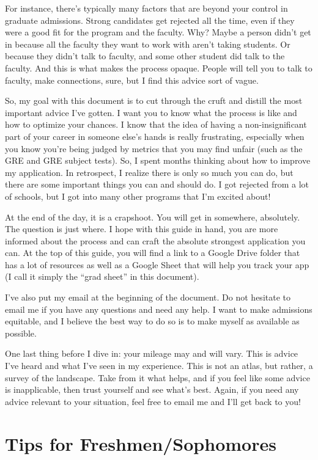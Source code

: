 \documentclass[12pt]{article}
\begin{document}
For instance, there's typically many factors that are beyond your control in graduate admissions. Strong candidates get rejected all the time, even if they were a good fit for the program and the faculty. Why? Maybe a person didn't get in because all the faculty they want to work with aren't taking students. Or because they didn't talk to faculty, and some other student did talk to the faculty. And this is what makes the process opaque. People will tell you to talk to faculty, make connections, sure, but I find this advice sort of vague.

So, my goal with this document is to cut through the cruft and distill the most important advice I've gotten. I want you to know what the process is like and how to optimize your chances. I know that the idea of having a non-insignificant part of your career in someone else's hands is really frustrating, especially when you know you're being judged by metrics that you may find unfair (such as the GRE and GRE subject tests). So, I spent months thinking about how to improve my application. In retrospect, I realize there is only so much you can do, but there are some important things you can and should do. I got rejected from a lot of schools, but I got into many other programs that I'm excited about! 

At the end of the day, it is a crapshoot. You will get in somewhere, absolutely. The question is just where. I hope with this guide in hand, you are more informed about the process and can craft the absolute strongest application you can. At the top of this guide, you will find a link to a Google Drive folder that has a lot of resources as well as a Google Sheet that will help you track your app (I call it simply the ``grad sheet'' in this document).

I've also put my email at the beginning of the document. Do not hesitate to email me if you have any questions and need any help. I want to make admissions equitable, and I believe the best way to do so is to make myself as available as possible.

One last thing before I dive in: your mileage may and will vary. This is advice I've heard and what I've seen in my experience. This is not an atlas, but rather, a survey of the landscape. Take from it what helps, and if you feel like some advice is inapplicable, then trust yourself and see what's best. Again, if you need any advice relevant to your situation, feel free to email me and I'll get back to you!

\section{Tips for Freshmen/Sophomores}
\end{document}
